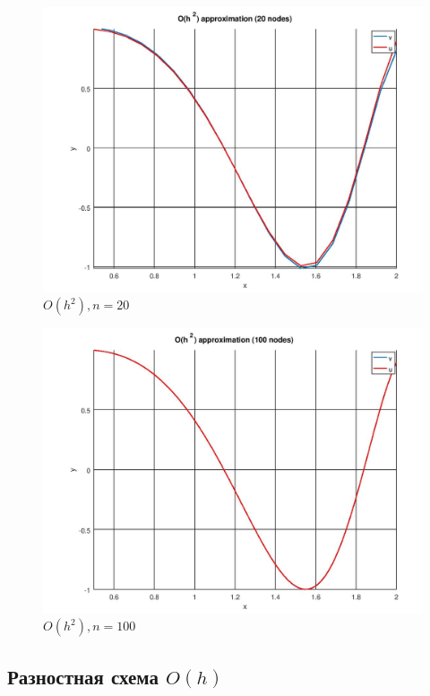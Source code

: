 \documentclass[12pt]{article}
\begin{document}
\begin{figure}
\begin{center}
\includegraphics[scale = 0.5]{h2_20.jpg} 
\end{center}
\caption{$O(h^2), n = 20$ }
\end{figure}

\begin{figure}
\begin{center}
\includegraphics[scale = 0.5]{h2_100.jpg} 
\end{center}
\caption{$O(h^2), n = 100$ }
\end{figure}

\subsection{Разностная схема $O(h)$}
\end{document}
